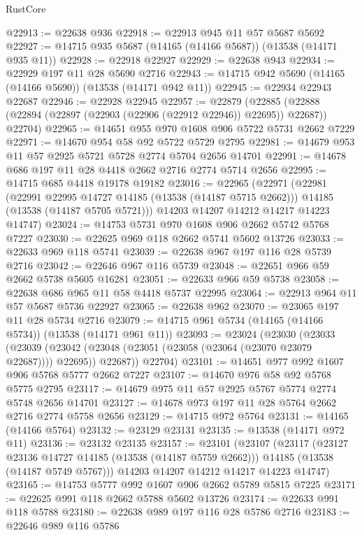 \begin{lexlean}{RustCore}
\begin{coremodule}
@22913 := @22638 @936
@22918 := @22913 @945 @11 @57 @5687 @5692
@22927 := @14715 @935 @5687 (@14165 (@14166 @5687)) (@13538 (@14171 @935 @11))
@22928 := @22918 @22927
@22929 := @22638 @943
@22934 := @22929 @197 @11 @28 @5690 @2716
@22943 := @14715 @942 @5690 (@14165 (@14166 @5690)) (@13538 (@14171 @942 @11))
@22945 := @22934 @22943 @22687
@22946 := @22928 @22945
@22957 := @22879
    (@22885 (@22888 (@22894 (@22897 (@22903 (@22906 (@22912 @22946)) @22695)) @22687)) @22704)
@22965 := @14651 @955 @970 @1608 @906 @5722 @5731 @2662 @7229
@22971 := @14670 @954 @58 @92 @5722 @5729 @2795
@22981 := @14679 @953 @11 @57 @2925 @5721 @5728 @2774 @5704 @2656 @14701
@22991 := @14678 @686 @197 @11 @28 @4418 @2662 @2716 @2774 @5714 @2656
@22995 := @14715 @685 @4418 @19178 @19182
@23016 := @22965
    (@22971
      (@22981
        (@22991 @22995 @14727 @14185 (@13538 (@14187 @5715 @2662)))
        @14185
        (@13538 (@14187 @5705 @5721)))
      @14203
      @14207
      @14212
      @14217
      @14223
      @14747)
@23024 := @14753 @5731 @970 @1608 @906 @2662 @5742 @5768 @7227
@23030 := @22625 @969 @118 @2662 @5741 @5602 @13726
@23033 := @22633 @969 @118 @5741
@23039 := @22638 @967 @197 @116 @28 @5739 @2716
@23042 := @22646 @967 @116 @5739
@23048 := @22651 @966 @59 @2662 @5738 @5605 @16281
@23051 := @22633 @966 @59 @5738
@23058 := @22638 @686 @965 @11 @58 @4418 @5737 @22995
@23064 := @22913 @964 @11 @57 @5687 @5736 @22927
@23065 := @22638 @962
@23070 := @23065 @197 @11 @28 @5734 @2716
@23079 := @14715 @961 @5734 (@14165 (@14166 @5734)) (@13538 (@14171 @961 @11))
@23093 := @23024
    (@23030
      (@23033
        (@23039 (@23042 (@23048 (@23051 (@23058 (@23064 (@23070 @23079 @22687)))) @22695)) @22687))
      @22704)
@23101 := @14651 @977 @992 @1607 @906 @5768 @5777 @2662 @7227
@23107 := @14670 @976 @58 @92 @5768 @5775 @2795
@23117 := @14679 @975 @11 @57 @2925 @5767 @5774 @2774 @5748 @2656 @14701
@23127 := @14678 @973 @197 @11 @28 @5764 @2662 @2716 @2774 @5758 @2656
@23129 := @14715 @972 @5764
@23131 := @14165 (@14166 @5764)
@23132 := @23129 @23131
@23135 := @13538 (@14171 @972 @11)
@23136 := @23132 @23135
@23157 := @23101
    (@23107
      (@23117
        (@23127 @23136 @14727 @14185 (@13538 (@14187 @5759 @2662)))
        @14185
        (@13538 (@14187 @5749 @5767)))
      @14203
      @14207
      @14212
      @14217
      @14223
      @14747)
@23165 := @14753 @5777 @992 @1607 @906 @2662 @5789 @5815 @7225
@23171 := @22625 @991 @118 @2662 @5788 @5602 @13726
@23174 := @22633 @991 @118 @5788
@23180 := @22638 @989 @197 @116 @28 @5786 @2716
@23183 := @22646 @989 @116 @5786

\end{coremodule}
\end{lexlean}
